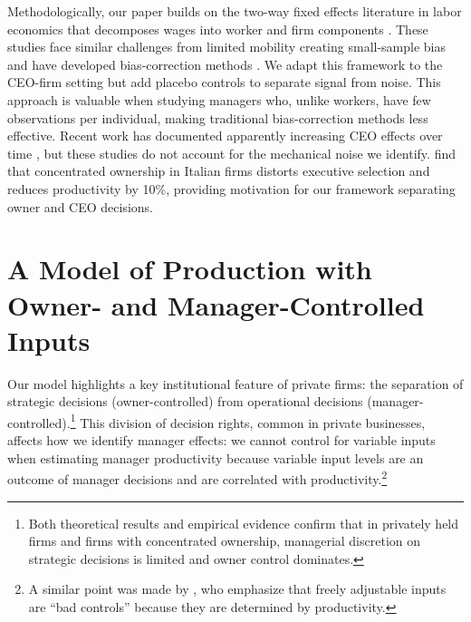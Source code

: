 \documentclass[11pt,a4paper]{article}
\begin{document}
Methodologically, our paper builds on the two-way fixed effects literature in labor economics that decomposes wages into worker and firm components \citep{Abowd1999Econometrica, Card2018JoLE}. These studies face similar challenges from limited mobility creating small-sample bias \citep{andrews2008high} and have developed bias-correction methods \citep{Bonhomme2023-dx, gaure2014correlation}. We adapt this framework to the CEO-firm setting but add placebo controls to separate signal from noise. This approach is valuable when studying managers who, unlike workers, have few observations per individual, making traditional bias-correction methods less effective. Recent work has documented apparently increasing CEO effects over time \citep{quigley2015has}, but these studies do not account for the mechanical noise we identify. \citet{lippi2014corporate} find that concentrated ownership in Italian firms distorts executive selection and reduces productivity by 10\%, providing motivation for our framework separating owner and CEO decisions.

\section{A Model of Production with Owner- and Manager-Controlled Inputs}

Our model highlights a key institutional feature of private firms: the separation of strategic decisions (owner-controlled) from operational decisions (manager-controlled).\footnote{Both theoretical results \citep{fama1983separation, jensen1976theory, burkart2003family, schulze2021property} and empirical evidence \citep{durand2003ownership, gao2015comparison, quigley2022does, cole2008privately, nakazato2011executive, gompers2023market, bloom2012organization, wang2019decentralization, buffington2017mops} confirm that in privately held firms and firms with concentrated ownership, managerial discretion on strategic decisions is limited and owner control dominates.} This division of decision rights, common in private businesses, affects how we identify manager effects: we cannot control for variable inputs when estimating manager productivity because variable input levels are an outcome of manager decisions and are correlated with productivity.\footnote{A similar point was made by \citet{Gandhi2020-nu}, who emphasize that freely adjustable inputs are ``bad controls'' because they are determined by productivity.} 
\end{document}
